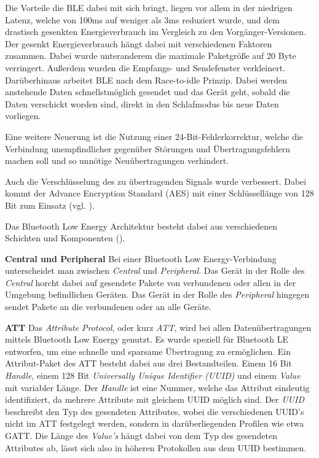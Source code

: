 Die Vorteile die BLE dabei mit sich bringt, liegen vor allem in der niedrigen Latenz, welche von 100ms auf weniger als 3ms reduziert wurde, und dem drastisch gesenkten Energieverbrauch im Vergleich zu den Vorgänger-Versionen. Der gesenkt Energieverbrauch hängt dabei mit verschiedenen Faktoren zusammen. 
Dabei wurde unteranderem die maximale Paketgröße auf 20 Byte verringert. Außerdem wurden die Empfangs- und Sendefenster verkleinert. 
Darüberhinaus arbeitet BLE nach dem Race-to-idle Prinzip. Dabei werden anstehende Daten schnellstmöglich gesendet und das Gerät geht, sobald die Daten verschickt worden sind, direkt in den Schlafmodus bis neue Daten vorliegen.

Eine weitere Neuerung ist die Nutzung einer 24-Bit-Fehlerkorrektur, welche die Verbindung unempfindlicher gegenüber Störungen und Übertragungsfehlern machen soll und so unnötige Neuübertragungen verhindert.

Auch die Verschlüsselung des zu übertragenden Signals wurde verbessert. Dabei kommt der Advance Encryption Standard (AES) mit einer Schlüssellänge von 128 Bit zum Einsatz (vgl. \citet{blespecs}). 

Das Bluetooth Low Energy Architektur besteht dabei aus verschiedenen Schichten und Komponenten (\citet{blespecsnordic}).

\textbf{Central und Peripheral}
Bei einer Bluetooth Low Energy-Verbindung unterscheidet man zwischen \emph{Central} und \emph{Peripheral}. Das Gerät in der Rolle des \emph{Central} horcht dabei auf gesendete Pakete von verbundenen oder allen in der Umgebung befindlichen Geräten. Das Gerät in der Rolle des \emph{Peripheral} hingegen sendet Pakete an die verbundenen oder an alle Geräte.


\textbf{ATT}
Das \emph{Attribute Protocol}, oder kurz \emph{ATT}, wird bei allen Datenübertragungen mittels Bluetooth Low Energy genutzt. Es wurde speziell für Bluetooth LE entworfen, um eine schnelle und sparsame Übertragung zu ermöglichen. 
Ein Attribut-Paket des ATT besteht dabei aus drei Bestandteilen. Einem 16 Bit \emph{Handle}, einem 128 Bit \emph{Universally Unique Identifier (UUID)} und einem \emph{Value} mit variabler Länge.
Der \emph{Handle} ist eine Nummer, welche das Attribut eindeutig identifiziert, da mehrere Attribute mit gleichem UUID möglich sind.
Der \emph{UUID} beschreibt den Typ des gesendeten Attributes, wobei die verschiedenen UUID's nicht im ATT festgelegt werden, sondern in darüberliegenden Profilen wie etwa GATT.
Die Länge des \emph{Value's} hängt dabei von dem Typ des gesendeten Attributes ab, lässt sich also in höheren Protokollen aus dem UUID bestimmen.


